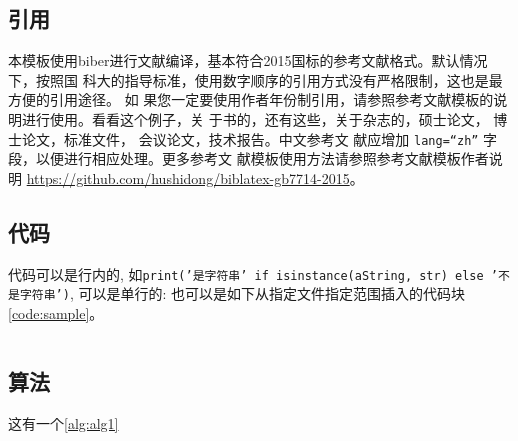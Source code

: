 \subsection{引用}
本模板使用biber进行文献编译，基本符合2015国标的参考文献格式。默认情况下，按照国
科大的指导标准，使用数字顺序的引用方式没有严格限制，这也是最方便的引用途径。 如
果您一定要使用作者年份制引用，请参照参考文献模板的说明进行使用。看看这个例子，关
于书的\cite{tex, companion, ColdSources}，还有这些\cite{Krasnogor2004e, clzs,
zjsw}，关于杂志的\cite{ELIDRISSI94, MELLINGER96, SHELL02}，硕士论文\cite{zhubajie, metamori2004}，
博士论文\cite{shaheshang, FistSystem01}，标准文件\cite{IEEE-1363}，
会议论文\cite{DPMG,kocher99}，技术报告\cite{NPB2}。中文参考文
献\cite{cnarticle}应增加 \texttt{lang=``zh''} 字段，以便进行相应处理。更多参考文
献模板使用方法请参照参考文献模板作者说明
\url{https://github.com/hushidong/biblatex-gb7714-2015}。

\subsection{代码}

代码可以是行内的, 如\texttt{print('是字符串' if isinstance(aString, str) else '不是字符串')}, 可以是单行的:
也可以是如下从指定文件指定范围插入的代码块\autoref{code:sample}。
\begin{listing}[H]
    \inputminted[firstline=16, lastline=37]{c}{assets/example.c}
    \label{code:sample}
\end{listing}

\subsection{算法}

这有一个\autoref{alg:alg1}


